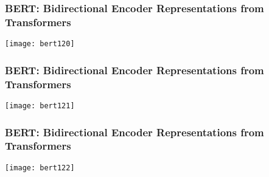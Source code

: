 \begin{frame}[fragile]\frametitle{BERT: Bidirectional Encoder Representations from Transformers}

			\begin{center}
			\texttt{[image: bert120]}
			\end{center}		
			

\end{frame}

\begin{frame}[fragile]\frametitle{BERT: Bidirectional Encoder Representations from Transformers}

			\begin{center}
			\texttt{[image: bert121]}
			\end{center}		
			

\end{frame}

\begin{frame}[fragile]\frametitle{BERT: Bidirectional Encoder Representations from Transformers}

			\begin{center}
			\texttt{[image: bert122]}
			\end{center}		
			

\end{frame}


